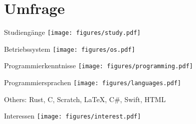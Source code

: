 \section{Umfrage}


\begin{frame}{Studiengänge}
  \flushright
  \texttt{[image: figures/study.pdf]}
\end{frame}

\begin{frame}{Betriebssystem}
  \flushright
  \texttt{[image: figures/os.pdf]}
\end{frame}

\begin{frame}{Programmierkenntnisse}
  \flushleft
  \texttt{[image: figures/programming.pdf]}
\end{frame}

\begin{frame}{Programmiersprachen}
  \centering
  \texttt{[image: figures/languages.pdf]}

  Others: Rust, C, Scratch, \LaTeX, C\#, Swift, HTML
\end{frame}

\begin{frame}{Interessen}
  \centering
  \texttt{[image: figures/interest.pdf]}
\end{frame}
